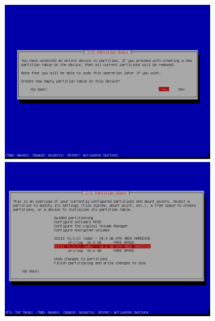 \documentclass[11pt]{article}
\begin{document}
\begin{figure}[H]
    \includegraphics[width=0.8\textwidth, keepaspectratio]{../img/raid install/raid3.png}
    \centering

    \includegraphics[width=0.8\textwidth, keepaspectratio]{../img/raid install/raid4.png}
    \centering
\end{figure}
\end{document}
